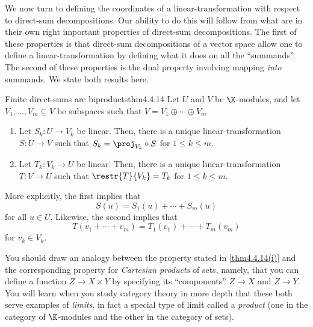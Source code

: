 \horizontalrule

We now turn to defining the coordinates of a linear-transformation with respect to direct-sum decompositions.  Our ability to do this will follow from what are in their own right important properties of direct-sum decompositions.  The first of these properties is that direct-sum decompositions of a vector space allow one to define a linear-transformation by defining what it does on all the ``summands''.  The second of these properties is the dual property involving mapping \emph{into} summands.  We state both results here.
\begin{thm}{Finite direct-sums are biproducts}{thm4.4.14}
	Let $U$ and $V$ be $\K$-modules, and let $V_1,\ldots ,V_m\subseteq V$ be subspaces such that $V=V_1\oplus \cdots \oplus V_m$.
	\begin{enumerate}
		\item \label{thm4.4.14(i)}Let $S_k\colon U\rightarrow V_k$ be linear.  Then, there is a unique linear-transformation $S\colon U\rightarrow V$ such that $S_k=\proj _{V_k}\circ S$ for $1\leq k\leq m$.
		\item \label{thm4.4.14(ii)}Let $T_k\colon V_k\rightarrow U$ be linear.  Then, there is a unique linear-transformation $T\colon V\rightarrow U$ such that $\restr{T}{V_k}=T_k$ for $1\leq k\leq m$.
	\end{enumerate}
	\begin{rmk}
		More explicitly, the first implies that
		\begin{equation}
			S(u)=S_1(u)+\cdots +S_m(u)
		\end{equation}
		for all $u\in U$.  Likewise, the second implies that
		\begin{equation}
			T(v_1+\cdots +v_m)=T_1(v_1)+\cdots +T_m(v_m)
		\end{equation}
		for $v_k\in V_k$.
	\end{rmk}
	\begin{rmk}
		You should draw an analogy between the property stated in \cref{thm4.4.14(i)} and the corresponding property for \emph{Cartesian products} of sets, namely, that you can define a function $Z\rightarrow X\times Y$ by specifying its ``components'' $Z\rightarrow X$ and $Z\rightarrow Y$.  You will learn when you study category theory in more depth that these both serve examples of \emph{limits}, in fact a special type of limit called a \emph{product} (one in the category of $\K$-modules and the other in the category of sets).
	\end{rmk}
	\begin{rmk}

\end{rmk}
\end{thm}
